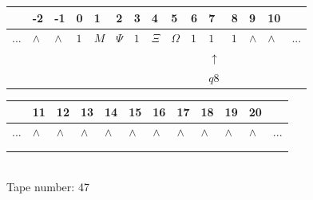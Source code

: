 \documentclass[11pt]{article}
\begin{document}
\begin{table}[H]
\centering
\begin{tabular}{lllllllllllllll}
 & -2 & -1 & 0 & 1 & 2 & 3 & 4 & 5 & 6 & 7 & 8 & 9 & 10 & \\
\hline
$...$ & \multicolumn{1}{|l|}{$\wedge$} & \multicolumn{1}{|l|}{$\wedge$} & \multicolumn{1}{|l|}{$1$} & \multicolumn{1}{|l|}{$M$} & \multicolumn{1}{|l|}{$\Psi$} & \multicolumn{1}{|l|}{$1$} & \multicolumn{1}{|l|}{$\Xi$} & \multicolumn{1}{|l|}{$\Omega$} & \multicolumn{1}{|l|}{$1$} & \multicolumn{1}{|l|}{$1$} & \multicolumn{1}{|l|}{$1$} & \multicolumn{1}{|l|}{$\wedge$} & \multicolumn{1}{|l|}{$\wedge$} & $...$\\
\hline
&  &  &  &  &  &  &  &  &  & $\uparrow$ &  &  &  &  \\
&  &  &  &  &  &  &  &  &  & $ q8 $ &  &  &  &  \\
\end{tabular}
\begin{tabular}{llllllllllll}
 & 11 & 12 & 13 & 14 & 15 & 16 & 17 & 18 & 19 & 20 & \\
\hline
$...$ & \multicolumn{1}{|l|}{$\wedge$} & \multicolumn{1}{|l|}{$\wedge$} & \multicolumn{1}{|l|}{$\wedge$} & \multicolumn{1}{|l|}{$\wedge$} & \multicolumn{1}{|l|}{$\wedge$} & \multicolumn{1}{|l|}{$\wedge$} & \multicolumn{1}{|l|}{$\wedge$} & \multicolumn{1}{|l|}{$\wedge$} & \multicolumn{1}{|l|}{$\wedge$} & \multicolumn{1}{|l|}{$\wedge$} & $...$\\
\hline
&  &  &  &  &  &  &  &  &  &  &  \\
&  &  &  &  &  &  &  &  &  &  &  \\
\end{tabular}
\\
Tape number: 47
\noindent\makebox[\linewidth]{\hdashrule{\textwidth}{1pt}{1pt}}\end{table}
\clearpage
\end{document}
